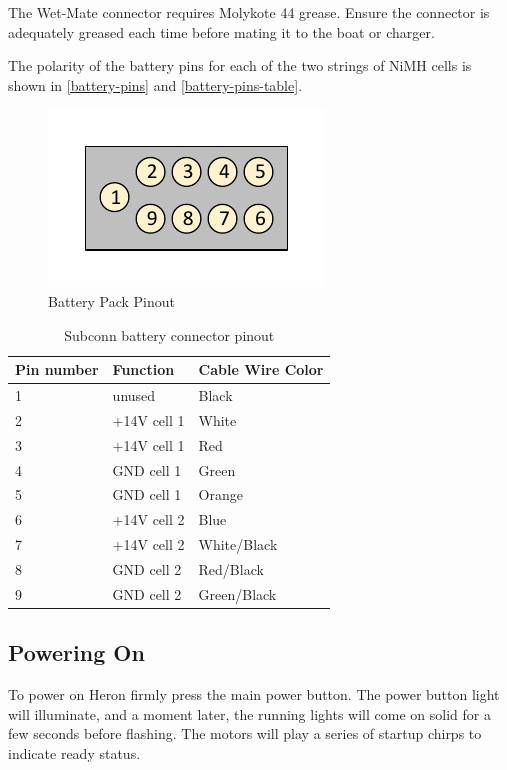 \documentclass[]{clearpath-latex/clearpath-manual}
\begin{document}
\begin{warning}
The Wet-Mate connector requires Molykote 44 grease. Ensure the connector is adequately greased each time before mating it to the boat or charger.
\end{warning}


The polarity of the battery pins for each of the two strings of NiMH cells is shown in \autoref{battery-pins} and \autoref{battery-pins-table}.

\begin{figure}[h]
  \centering
  \includegraphics[width=0.5\linewidth]{graphics/h-batpin.pdf}
  \caption{Battery Pack Pinout}
  \label{battery-pins}
\end{figure}

\begin{table}[h]
\centering
\label{chg_pinout}
\begin{tabular}{|l|l|l|}
Pin number  & Function & Cable Wire Color \\
\hline
1  & unused & Black         \\ \hline
2  & +14V cell 1 & White  	\\ \hline
3  & +14V cell 1 & Red		\\ \hline
4  & GND cell 1 & Green     \\ \hline
5  & GND cell 1 & Orange    \\ \hline
6  & +14V cell 2 & Blue     \\ \hline
7  & +14V cell 2 & White/Black	\\ \hline
8  & GND cell 2 & Red/Black		\\ \hline
9  & GND cell 2 & Green/Black	\\ \hline

\end{tabular}
\label{battery-pins-table}
\caption{Subconn battery connector pinout}
\end{table}

\newpage

\subsection{Powering On}
To power on Heron firmly press the main power button. The power button light will illuminate, and a moment later, the running lights will come on solid for a few seconds before flashing. The motors will play a series of startup chirps to indicate ready status.
\end{document}
